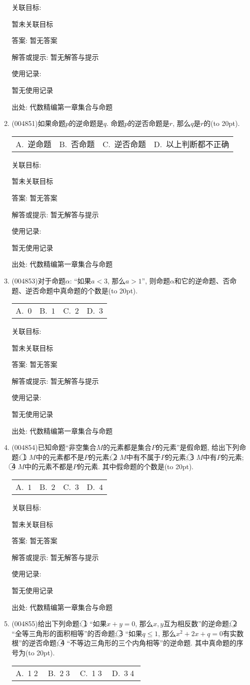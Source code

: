 \documentclass[10pt,a4paper]{article}
\newcommand{\bracket}[1]{(\hbox to #1pt{})}
\newcommand{\fourch}[4]{\par\begin{tabular}{p{.23\textwidth}p{.23\textwidth}p{.23\textwidth}p{.23\textwidth}}
A.~#1 &B.~#2& C.~#3& D.~#4
\end{tabular}}
\begin{document}
\begin{enumerate}[1.]
关联目标:

暂未关联目标

答案: 暂无答案

解答或提示: 暂无解答与提示

使用记录:

暂无使用记录


出处: 代数精编第一章集合与命题
\item { (004851)}如果命题$p$的逆命题是$q$. 命题$p$的逆否命题是$r$, 那么$q$是$r$的\bracket{20}.
\fourch{逆命题}{否命题}{逆否命题}{以上判断都不正确}


关联目标:

暂未关联目标

答案: 暂无答案

解答或提示: 暂无解答与提示

使用记录:

暂无使用记录


出处: 代数精编第一章集合与命题
\item { (004853)}对于命题$\alpha$: ``如果$a<3$, 那么$a>1$'', 则命题$\alpha$和它的逆命题、否命题、逆否命题中真命题的个数是\bracket{20}.
\fourch{$0$}{$1$}{$2$}{$3$}


关联目标:

暂未关联目标

答案: 暂无答案

解答或提示: 暂无解答与提示

使用记录:

暂无使用记录


出处: 代数精编第一章集合与命题
\item { (004854)}已知命题``非空集合$M$的元素都是集合$P$的元素''是假命题, 给出下列命题: \textcircled{1} $M$中的元素都不是$P$的元素; \textcircled{2} $M$中有不属于$P$的元素; \textcircled{3} $M$中有$P$的元素; \textcircled{4} $M$中的元素不都是$P$的元素. 其中假命题的个数是\bracket{20}.
\fourch{$1$}{$2$}{$3$}{$4$}


关联目标:

暂未关联目标

答案: 暂无答案

解答或提示: 暂无解答与提示

使用记录:

暂无使用记录


出处: 代数精编第一章集合与命题
\item { (004855)}给出下列命题: \textcircled{1} ``如果$x+y=0$, 那么$x,y$互为相反数''的逆命题; \textcircled{2} ``全等三角形的面积相等''的否命题; \textcircled{3} ``如果$q\le 1$, 那么$x^2+2x+q=0$有实数根''的逆否命题; \textcircled{4} ``不等边三角形的三个内角相等''的逆命题. 其中真命题的序号为\bracket{20}.
\fourch{\textcircled{1}\textcircled{2}}{\textcircled{2}\textcircled{3}}{\textcircled{1}\textcircled{3}}{\textcircled{3}\textcircled{4}}



\end{enumerate}
\end{document}
